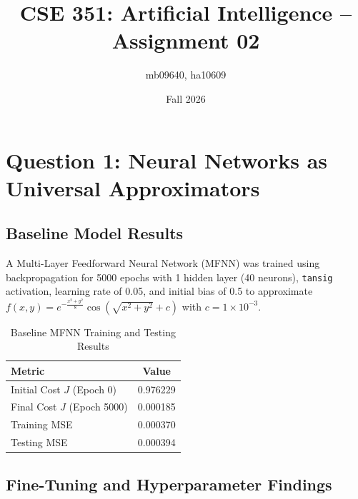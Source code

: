 \documentclass[11pt]{article}
\title{CSE 351: Artificial Intelligence -- Assignment 02}
\author{mb09640, ha10609}
\date{Fall 2026}
\begin{document}
\maketitle

\section*{Question 1: Neural Networks as Universal Approximators}

\subsection*{Baseline Model Results}
A Multi-Layer Feedforward Neural Network (MFNN) was trained using backpropagation for 5000 epochs with 1 hidden layer (40 neurons), \texttt{tansig} activation, learning rate of 0.05, and initial bias of 0.5 to approximate $f(x, y) = e^{-\frac{x^2+y^2}{8}}\cos(\sqrt{x^2+y^2}+c)$ with $c = 1 \times 10^{-3}$.

\begin{table}[h!]
\centering
\begin{tabular}{|l|c|}
\hline
\textbf{Metric} & \textbf{Value} \tabularnewline \hline
Initial Cost $J$ (Epoch 0) & 0.976229 \tabularnewline \hline
Final Cost $J$ (Epoch 5000) & 0.000185 \tabularnewline \hline
Training MSE & 0.000370 \tabularnewline \hline
Testing MSE & 0.000394 \tabularnewline \hline
\end{tabular}
\caption{Baseline MFNN Training and Testing Results}
\end{table}


\subsection*{Fine-Tuning and Hyperparameter Findings}
\end{document}
